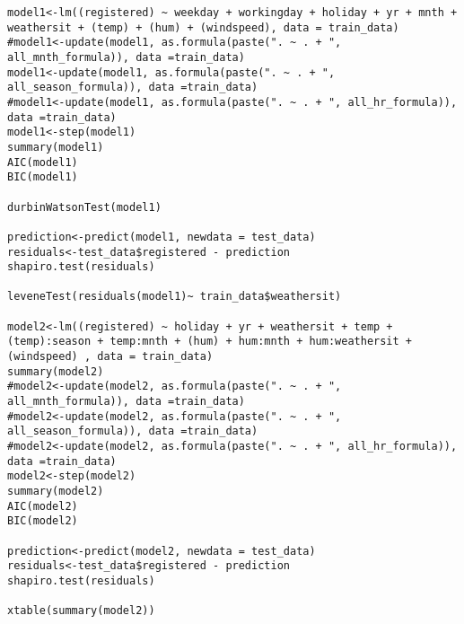 \begin{lstlisting}
model1<-lm((registered) ~ weekday + workingday + holiday + yr + mnth + weathersit + (temp) + (hum) + (windspeed), data = train_data)
#model1<-update(model1, as.formula(paste(". ~ . + ", all_mnth_formula)), data =train_data)
model1<-update(model1, as.formula(paste(". ~ . + ", all_season_formula)), data =train_data)
#model1<-update(model1, as.formula(paste(". ~ . + ", all_hr_formula)), data =train_data)
model1<-step(model1)
summary(model1)
AIC(model1)
BIC(model1)

durbinWatsonTest(model1)

prediction<-predict(model1, newdata = test_data)
residuals<-test_data$registered - prediction
shapiro.test(residuals)

leveneTest(residuals(model1)~ train_data$weathersit)

model2<-lm((registered) ~ holiday + yr + weathersit + temp + (temp):season + temp:mnth + (hum) + hum:mnth + hum:weathersit + (windspeed) , data = train_data)
summary(model2)
#model2<-update(model2, as.formula(paste(". ~ . + ", all_mnth_formula)), data =train_data)
#model2<-update(model2, as.formula(paste(". ~ . + ", all_season_formula)), data =train_data)
#model2<-update(model2, as.formula(paste(". ~ . + ", all_hr_formula)), data =train_data)
model2<-step(model2)
summary(model2)
AIC(model2)
BIC(model2)

prediction<-predict(model2, newdata = test_data)
residuals<-test_data$registered - prediction
shapiro.test(residuals)

xtable(summary(model2))
\end{lstlisting}